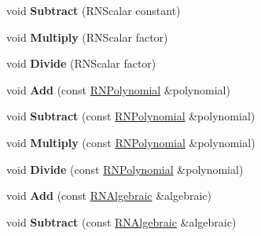 \begin{DoxyCompactItemize}
\item 
void {\bfseries Subtract} (R\+N\+Scalar constant)\hypertarget{class_r_n_algebraic_a7c56793a006f3c097e55f7212d2eb609}{}\label{class_r_n_algebraic_a7c56793a006f3c097e55f7212d2eb609}

\item 
void {\bfseries Multiply} (R\+N\+Scalar factor)\hypertarget{class_r_n_algebraic_a4af74b3923622c695f3c221e793e9bb5}{}\label{class_r_n_algebraic_a4af74b3923622c695f3c221e793e9bb5}

\item 
void {\bfseries Divide} (R\+N\+Scalar factor)\hypertarget{class_r_n_algebraic_a2b135010eef59629d3253fda68c534d6}{}\label{class_r_n_algebraic_a2b135010eef59629d3253fda68c534d6}

\item 
void {\bfseries Add} (const \hyperlink{class_r_n_polynomial}{R\+N\+Polynomial} \&polynomial)\hypertarget{class_r_n_algebraic_afc55649f9f4baf36f457a1f5434a1571}{}\label{class_r_n_algebraic_afc55649f9f4baf36f457a1f5434a1571}

\item 
void {\bfseries Subtract} (const \hyperlink{class_r_n_polynomial}{R\+N\+Polynomial} \&polynomial)\hypertarget{class_r_n_algebraic_ab1b86097215d7ff3cd72fdfc231be2ce}{}\label{class_r_n_algebraic_ab1b86097215d7ff3cd72fdfc231be2ce}

\item 
void {\bfseries Multiply} (const \hyperlink{class_r_n_polynomial}{R\+N\+Polynomial} \&polynomial)\hypertarget{class_r_n_algebraic_a4dbeaa3bc5116516a8fa02421f5f4af8}{}\label{class_r_n_algebraic_a4dbeaa3bc5116516a8fa02421f5f4af8}

\item 
void {\bfseries Divide} (const \hyperlink{class_r_n_polynomial}{R\+N\+Polynomial} \&polynomial)\hypertarget{class_r_n_algebraic_a01b70e7cb2e63f14bc480fb0aad355da}{}\label{class_r_n_algebraic_a01b70e7cb2e63f14bc480fb0aad355da}

\item 
void {\bfseries Add} (const \hyperlink{class_r_n_algebraic}{R\+N\+Algebraic} \&algebraic)\hypertarget{class_r_n_algebraic_a79850fefd48b7fce13e83d6661a9ac9f}{}\label{class_r_n_algebraic_a79850fefd48b7fce13e83d6661a9ac9f}

\item 
void {\bfseries Subtract} (const \hyperlink{class_r_n_algebraic}{R\+N\+Algebraic} \&algebraic)\hypertarget{class_r_n_algebraic_a4e2c4b60ce1004642f15e67e04d4c8ae}{}\label{class_r_n_algebraic_a4e2c4b60ce1004642f15e67e04d4c8ae}


\end{DoxyCompactItemize}
